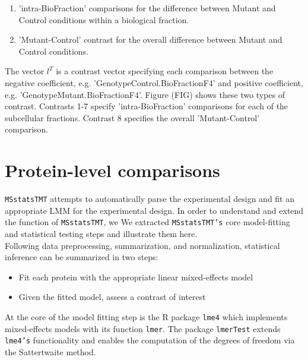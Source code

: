 \documentclass[11pt]{elife}\usepackage[]{graphicx}\usepackage[]{color}
\begin{document}
\begin{enumerate}
	\item 'intra-BioFraction' comparisons for the difference between
		Mutant and Control conditions within a biological fraction.
	\item 'Mutant-Control' contrast for the overall difference between
		Mutant and Control conditions.
\end{enumerate}

The vector $l^T$ is a contrast vector specifying each comparison between the
negative coefficient, e.g. 'GenotypeControl.BioFractionF4' and positive
coefficient, e.g. 'GenotypeMutant.BioFractionF4'. Figure (FIG) shows these two
types of contrast. Contrasts 1-7 specify 'intra-BioFraction' comparisons for
each of the subcellular fractions. Contrast 8 specifies the overall
'Mutant-Control' comparison.\\

\section{Protein-level comparisons}

\texttt{MSstatsTMT} attempts to automatically parse the experimental design and
fit an appropriate LMM for the experimental design. 
In order to understand and extend the function of \texttt{MSstatsTMT}, we 
We extracted \texttt{MSstatsTMT's} core model-fitting and statistical testing 
steps and illustrate them here.\\

Following data preprocessing, summarization, and normalization, statistical
inference can be summarized in two steps:\\

\begin{itemize}
	\item Fit each protein with the appropriate linear mixed-effects model
	\item Given the fitted model, assess a contrast of interest 
\end{itemize}
		
At the core of the model fitting step is the
R package \texttt{lme4} which implements mixed-effects models with its function
\texttt{lmer}. The package \texttt{lmerTest} extends \texttt{lme4's}
functionality and enables the computation of the degrees of freedom via the
Sattertwaite method.\\
\end{document}

